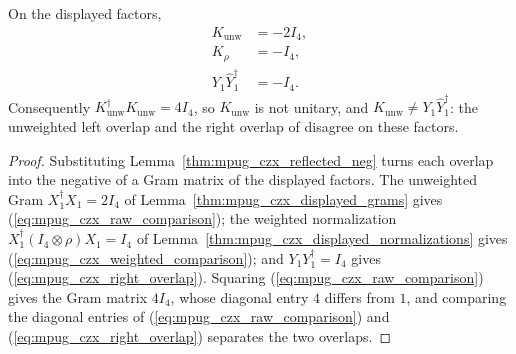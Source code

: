 \begin{lemma}
    \label{thm:mpug_czx_comparison_coordinates}
    \leanok
    On the displayed factors,
    \begin{align}
        K_{\mathrm{unw}}        & =-2I_4,
        \label{eq:mpug_czx_raw_comparison}      \\
        K_\rho                  & =-I_4,
        \label{eq:mpug_czx_weighted_comparison} \\
        Y_1\widehat Y_1^\dagger & =-I_4.
        \label{eq:mpug_czx_right_overlap}
    \end{align}
    Consequently $K_{\mathrm{unw}}^\dagger K_{\mathrm{unw}}=4I_4$, so
    $K_{\mathrm{unw}}$ is not unitary, and
    $K_{\mathrm{unw}}\neq Y_1\widehat Y_1^\dagger$: the unweighted left
    overlap and the right overlap of
    \cite[lines~5438--5441]{FrancoRubio2025MPUGauging} disagree on these
    factors.
\end{lemma}
\begin{proof}\leanok
    Substituting Lemma~\ref{thm:mpug_czx_reflected_neg} turns each
    overlap into the negative of a Gram matrix of the displayed factors.
    The unweighted Gram $X_1^\dagger X_1=2I_4$ of
    Lemma~\ref{thm:mpug_czx_displayed_grams} gives
    (\ref{eq:mpug_czx_raw_comparison}); the weighted normalization
    $X_1^\dagger(I_4\otimes\rho)X_1=I_4$ of
    Lemma~\ref{thm:mpug_czx_displayed_normalizations} gives
    (\ref{eq:mpug_czx_weighted_comparison}); and $Y_1Y_1^\dagger=I_4$ gives
    (\ref{eq:mpug_czx_right_overlap}). Squaring
    (\ref{eq:mpug_czx_raw_comparison}) gives the Gram matrix $4I_4$, whose
    diagonal entry $4$ differs from $1$, and comparing the diagonal entries
    of (\ref{eq:mpug_czx_raw_comparison}) and
    (\ref{eq:mpug_czx_right_overlap}) separates the two overlaps.
\end{proof}

